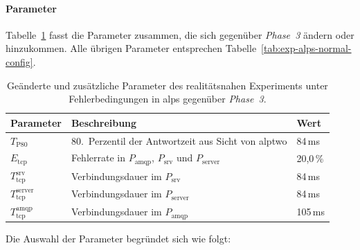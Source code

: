 \paragraph{Parameter}

Tabelle~\ref{tab:exp-alps-realistic-config} fasst die Parameter zusammen, die sich gegenüber \textit{Phase~3} ändern oder hinzukommen. Alle übrigen Parameter entsprechen Tabelle~\ref{tab:exp-alps-normal-config}.

\begin{table}[H]
    \centering
    \renewcommand{\arraystretch}{1.2}
    \caption{Geänderte und zusätzliche Parameter des realitätsnahen Experiments unter Fehlerbedingungen in \acrshort{alps} gegenüber \textit{Phase~3}.}
    \label{tab:exp-alps-realistic-config}
    \begin{tabular}{|l|l|l|}
        \hline
        \textbf{Parameter}               & \textbf{Beschreibung}                                                     & \textbf{Wert} \\
        \hline
        $T_{\text{P80}}$                 & 80.~Perzentil der Antwortzeit aus Sicht von \gls{alptwo}                  & 84\,ms        \\
        $E_{\text{tcp}}$                 & Fehlerrate in $P_{\text{amqp}}$, $P_{\text{srv}}$ und $P_{\text{server}}$ & 20{,}0\,\%    \\
        $T_{\text{tcp}}^{\text{srv}}$    & Verbindungsdauer im $P_{\text{srv}}$                                      & 84\,ms        \\
        $T_{\text{tcp}}^{\text{server}}$ & Verbindungsdauer im $P_{\text{server}}$                                   & 84\,ms        \\
        $T_{\text{tcp}}^{\text{amqp}}$   & Verbindungsdauer im $P_{\text{amqp}}$                                     & 105\,ms       \\
        \hline
    \end{tabular}
\end{table}


Die Auswahl der Parameter begründet sich wie folgt:

